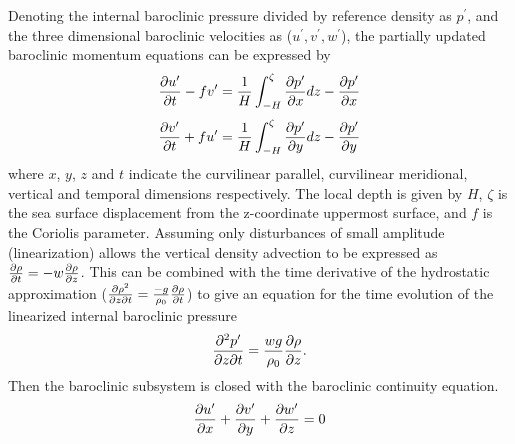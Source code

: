 Denoting the internal baroclinic pressure divided by reference density as $p^{\prime}$,
and the three dimensional baroclinic velocities as ($u^{\prime},v^{\prime},w^{\prime}$),
the partially updated baroclinic momentum equations can be expressed by
\begin{equation}
\label{eqn:baroclinic_mom_u}
{\partial u^{\prime} \over{\partial t}} - f v^{\prime}
= 
{1 \over{H}} \int_{-H}^{\zeta}{\partial p^{\prime} \over{\partial x}}dz
- {\partial p^{\prime} \over{\partial x}}
\end{equation}
\begin{equation}
\label{eqn:baroclinic_mom_v}
{\partial v^{\prime} \over{\partial t}} + f u^{\prime}
=
{1 \over{H}} \int_{-H}^{\zeta}{\partial p^{\prime} \over{\partial y}}dz
- {\partial p^{\prime} \over{\partial y}}
\end{equation}
where $x$, $y$, $z$ and $t$ indicate the curvilinear parallel, curvilinear meridional,
vertical and temporal dimensions respectively.
The local depth is given by $H$, 
$\zeta$ is the sea surface displacement from the z-coordinate uppermost surface,
and $f$ is the Coriolis parameter.
Assuming only disturbances of small amplitude (linearization) 
allows the vertical density advection
to be expressed as 
${\partial \rho \over{\partial t}}=-w{\partial \rho \over{\partial z}}$.
This can be combined with the time derivative of the hydrostatic approximation
(${\partial \rho^2 \over{\partial z \partial t}}=
{-g \over \rho_0 }{\partial \rho \over{\partial t}}$)
to give an equation for the time evolution of the linearized internal baroclinic pressure
\begin{equation}
\label{eqn:baroclinic_press}
{\partial^{2} p^{\prime} \over{\partial z \partial t}}
=
{w g \over \rho_0} {\partial \rho \over \partial z}.
\end{equation}
Then the baroclinic subsystem is closed with the baroclinic continuity equation.
\begin{equation}
\label{eqn:baroclinic_cont}
  {\partial u^{\prime} \over{\partial x}} 
+ {\partial v^{\prime} \over{\partial y}} 
+ {\partial w^{\prime} \over{\partial z}} 
= 0
\end{equation}

